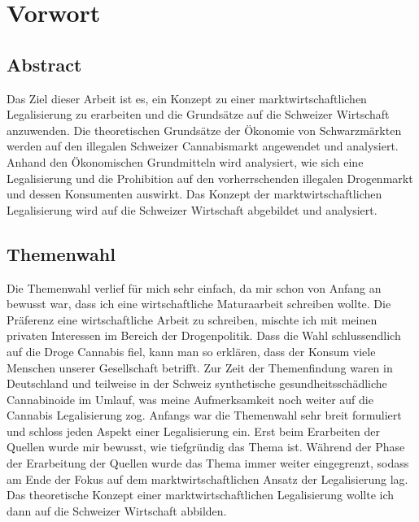 \documentclass[../main.tex]{subfiles}
\begin{document}
	\section*{Vorwort}
	
	\subsection*{Abstract}
	Das Ziel dieser Arbeit ist es, ein Konzept zu einer marktwirtschaftlichen Legalisierung zu erarbeiten und die Grundsätze auf die Schweizer Wirtschaft anzuwenden. 
	Die theoretischen Grundsätze der Ökonomie von Schwarzmärkten werden auf den illegalen Schweizer Cannabismarkt angewendet und analysiert. Anhand den Ökonomischen Grundmitteln wird analysiert, wie sich eine Legalisierung und die Prohibition auf den vorherrschenden illegalen Drogenmarkt und dessen Konsumenten auswirkt.
	Das Konzept der marktwirtschaftlichen Legalisierung wird auf die Schweizer Wirtschaft abgebildet und analysiert.
	
	
	
	\subsection*{Themenwahl}
	Die Themenwahl verlief für mich sehr einfach, da mir schon von Anfang an bewusst war, dass ich eine wirtschaftliche Maturaarbeit schreiben wollte. 
	Die Präferenz eine wirtschaftliche Arbeit zu schreiben, mischte ich mit meinen privaten Interessen im Bereich der Drogenpolitik. 
	Dass die Wahl schlussendlich auf die Droge Cannabis fiel, kann man so erklären, dass der Konsum viele Menschen unserer Gesellschaft betrifft. 
	Zur Zeit der Themenfindung waren in Deutschland und teilweise in der Schweiz synthetische gesundheitsschädliche Cannabinoide im Umlauf, was meine Aufmerksamkeit noch weiter auf die Cannabis Legalisierung zog. 
	Anfangs war die Themenwahl sehr breit formuliert und schloss jeden Aspekt einer Legalisierung ein. 
	Erst beim Erarbeiten der Quellen wurde mir bewusst, wie tiefgründig das Thema ist.	
	Während der Phase der Erarbeitung der Quellen wurde das Thema immer weiter eingegrenzt, sodass am Ende der Fokus auf dem marktwirtschaftlichen Ansatz der Legalisierung lag.
	Das theoretische Konzept einer marktwirtschaftlichen Legalisierung wollte ich dann auf die Schweizer Wirtschaft abbilden.
	
\end{document}
